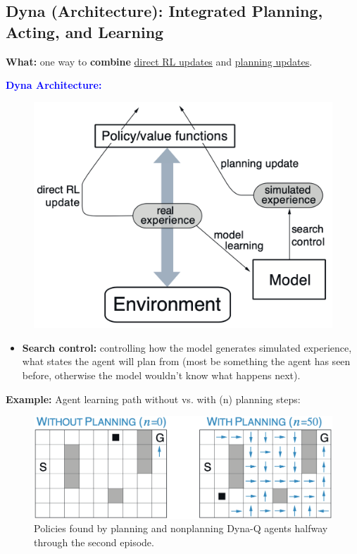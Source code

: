 \documentclass[12pt, a4paper]{article}
\begin{document}
\subsection{Dyna (Architecture): Integrated Planning, Acting, and Learning}\label{dyna}

\textbf{What:} one way to \textbf{combine} \uline{direct RL updates} and \uline{planning updates}.


\textbf{\textcolor{blue}{Dyna Architecture:}}
\begin{figure}[H]
  \centering
    \includegraphics[width=0.8\columnwidth]{images/dyna-architecture.png}
    \label{fig:dyna-architecture}
\end{figure}
\begin{itemize}
  \item \textbf{Search control:} controlling how the model generates simulated experience, what states the agent will plan from (most be something the agent has seen before, otherwise the model wouldn't know what happens next).
\end{itemize}


\textbf{Example:} Agent learning path without vs. with (n) planning steps:
\begin{figure}[H]
  \centering
    \includegraphics[width=0.8\columnwidth]{images/planning-vs-not.png}
    \caption{Policies found by planning and nonplanning Dyna-Q agents halfway through the second episode.}
    \label{fig:planning-vs-not}
\end{figure}
\end{document}
